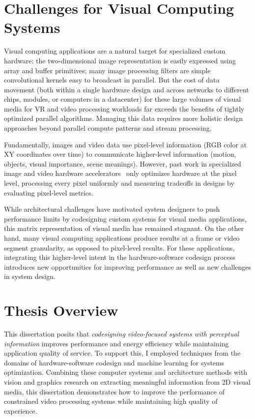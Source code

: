 \section{Challenges for Visual Computing Systems}
Visual computing applications are a natural target for specialized custom hardware: the two-dimensional image representation is easily expressed using array and buffer primitives; many image processing filters are simple convolutional kernels easy to broadcast in parallel.
But the cost of data movement (both within a single hardware design and across networks to different chips, modules, or computers in a datacenter) for these large volumes of visual media for VR and video processing workloads far exceeds the benefits of tightly optimized parallel algorithms.
Managing this data requires more holistic design approaches beyond parallel compute patterns and stream processing.

Fundamentally, images and video data use pixel-level information (RGB color at XY coordinates over time) to communicate higher-level information (motion, objects, visual importance, scene meanings).
However, past work in specialized image and video hardware accelerators~\cite{hauswald2014hybrid, convolution_engine, adams2010frankencamera} only optimizes hardware at the pixel level, processing every pixel uniformly and measuring tradeoffs in designs by evaluating pixel-level metrics.

While architectural challenges have motivated system designers to push performance limits by codesigning custom systems for visual media applications, this matrix representation of visual media has remained stagnant.
On the other hand, many visual computing applications produce results at a frame or video segment granularity, as opposed to pixel-level results.
For these applications, integrating this higher-level intent in the hardware-software codesign process introduces new opportunities for improving performance as well as new challenges in system design.

\section{Thesis Overview}
This dissertation posits that \emph{codesigning video-focused systems with perceptual information} improves performance and energy efficiency while maintaining application quality of service.
To support this, I employed techniques from the domains of hardware-software codesign and machine learning for systems optimization.
Combining these computer systems and architecture methods with vision and graphics research on extracting meaningful information from 2D visual media, this dissertation demonstrates how to improve the performance of constrained video processing systems while maintaining high quality of experience.

